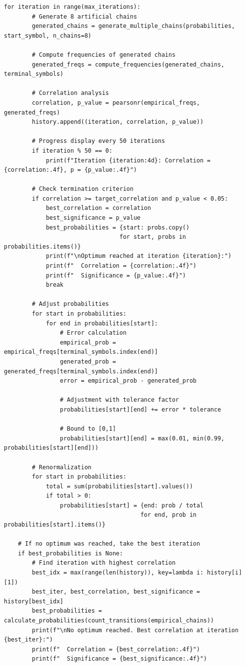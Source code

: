 \documentclass[
  12pt,
  a4paper,
  oneside,
  titlepage
]{article}
\begin{document}
\begin{lstlisting}[caption=Algorithmic Recursive Sequence Analysis 2.0 - Complete Code]
    for iteration in range(max_iterations):
        # Generate 8 artificial chains
        generated_chains = generate_multiple_chains(probabilities, start_symbol, n_chains=8)
        
        # Compute frequencies of generated chains
        generated_freqs = compute_frequencies(generated_chains, terminal_symbols)
        
        # Correlation analysis
        correlation, p_value = pearsonr(empirical_freqs, generated_freqs)
        history.append((iteration, correlation, p_value))
        
        # Progress display every 50 iterations
        if iteration % 50 == 0:
            print(f"Iteration {iteration:4d}: Correlation = {correlation:.4f}, p = {p_value:.4f}")
        
        # Check termination criterion
        if correlation >= target_correlation and p_value < 0.05:
            best_correlation = correlation
            best_significance = p_value
            best_probabilities = {start: probs.copy() 
                                 for start, probs in probabilities.items()}
            print(f"\nOptimum reached at iteration {iteration}:")
            print(f"  Correlation = {correlation:.4f}")
            print(f"  Significance = {p_value:.4f}")
            break
        
        # Adjust probabilities
        for start in probabilities:
            for end in probabilities[start]:
                # Error calculation
                empirical_prob = empirical_freqs[terminal_symbols.index(end)]
                generated_prob = generated_freqs[terminal_symbols.index(end)]
                error = empirical_prob - generated_prob
                
                # Adjustment with tolerance factor
                probabilities[start][end] += error * tolerance
                
                # Bound to [0,1]
                probabilities[start][end] = max(0.01, min(0.99, probabilities[start][end]))
        
        # Renormalization
        for start in probabilities:
            total = sum(probabilities[start].values())
            if total > 0:
                probabilities[start] = {end: prob / total 
                                       for end, prob in probabilities[start].items()}
    
    # If no optimum was reached, take the best iteration
    if best_probabilities is None:
        # Find iteration with highest correlation
        best_idx = max(range(len(history)), key=lambda i: history[i][1])
        best_iter, best_correlation, best_significance = history[best_idx]
        best_probabilities = calculate_probabilities(count_transitions(empirical_chains))
        print(f"\nNo optimum reached. Best correlation at iteration {best_iter}:")
        print(f"  Correlation = {best_correlation:.4f}")
        print(f"  Significance = {best_significance:.4f}")
    

\end{lstlisting}
\end{document}
